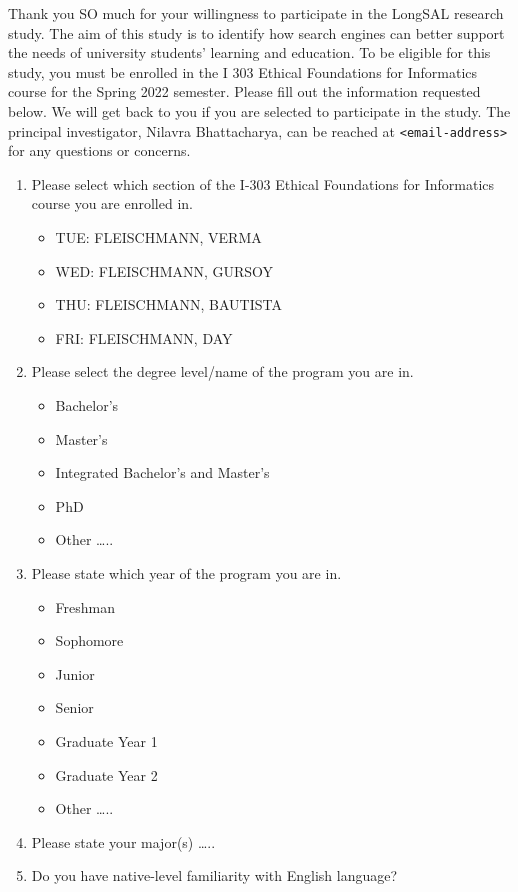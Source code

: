 \documentclass[letterpaper, nobind]{templates/ociamthesis}
\providecommand{\tightlist}{%
  \setlength{\itemsep}{0pt}\setlength{\parskip}{0pt}}
\begin{document}
Thank you SO much for your willingness to participate in the LongSAL research study. The aim of this study is to identify how search engines can better support the needs of university students' learning and education. To be eligible for this study, you must be enrolled in the I 303 Ethical Foundations for Informatics course for the Spring 2022 semester. Please fill out the information requested below. We will get back to you if you are selected to participate in the study. The principal investigator, Nilavra Bhattacharya, can be reached at \texttt{\textless{}email-address\textgreater{}} for any questions or concerns.

\begin{enumerate}
\def\labelenumi{\arabic{enumi}.}
\item
  Please select which section of the I-303 Ethical Foundations for Informatics course you are enrolled in.

  \begin{itemize}
  \tightlist
  \item
    TUE: FLEISCHMANN, VERMA
  \item
    WED: FLEISCHMANN, GURSOY
  \item
    THU: FLEISCHMANN, BAUTISTA
  \item
    FRI: FLEISCHMANN, DAY
  \end{itemize}
\item
  Please select the degree level/name of the program you are in.

  \begin{itemize}
  \tightlist
  \item
    Bachelor's
  \item
    Master's
  \item
    Integrated Bachelor's and Master's
  \item
    PhD
  \item
    Other \ldots..
  \end{itemize}
\item
  Please state which year of the program you are in.

  \begin{itemize}
  \tightlist
  \item
    Freshman
  \item
    Sophomore
  \item
    Junior
  \item
    Senior
  \item
    Graduate Year 1
  \item
    Graduate Year 2
  \item
    Other \ldots..
  \end{itemize}
\item
  Please state your major(s) \ldots..
\item
  Do you have native-level familiarity with English language?


\end{enumerate}
\end{document}
